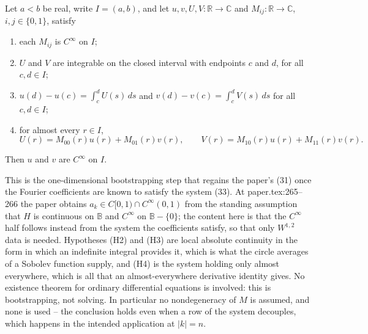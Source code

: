 \begin{lemma}
Let $a<b$ be real, write $I=(a,b)$, and let
$u,v,U,V\colon\mathbb{R}\to\mathbb{C}$ and
$M_{ij}\colon\mathbb{R}\to\mathbb{C}$, $i,j\in\{0,1\}$, satisfy
\begin{enumerate}
\item[(H1)] each $M_{ij}$ is $C^\infty$ on $I$;
\item[(H2)] $U$ and $V$ are integrable on the closed interval with endpoints
  $c$ and $d$, for all $c,d\in I$;
\item[(H3)] $u(d)-u(c)=\displaystyle\int_c^dU(s)\,ds$ and
  $v(d)-v(c)=\displaystyle\int_c^dV(s)\,ds$ for all $c,d\in I$;
\item[(H4)] for almost every $r\in I$,
\[
  U(r)=M_{00}(r)u(r)+M_{01}(r)v(r),
  \qquad
  V(r)=M_{10}(r)u(r)+M_{11}(r)v(r).
\]
\end{enumerate}
Then $u$ and $v$ are $C^\infty$ on $I$.

This is the one-dimensional bootstrapping step that regains the paper's (31)
once the Fourier coefficients are known to satisfy the system (33).  At
paper.tex:265--266 the paper obtains $a_k\in C[0,1)\cap C^\infty(0,1)$ from the
standing assumption that $H$ is continuous on $\mathbb{B}$ and $C^\infty$ on
$\mathbb{B}-\{0\}$; the content here is that the $C^\infty$ half follows instead
from the system the coefficients satisfy, so that only $W^{1,2}$ data is
needed.  Hypotheses (H2) and (H3) are local absolute continuity in the form in
which an indefinite integral provides it, which is what the circle averages of
a Sobolev function supply, and (H4) is the system holding only almost
everywhere, which is all that an almost-everywhere derivative identity gives.
No existence theorem for ordinary differential equations is involved: this is
bootstrapping, not solving.  In particular no nondegeneracy of $M$ is assumed,
and none is used -- the conclusion holds even when a row of the system
decouples, which happens in the intended application at $|k|=n$.
\end{lemma}

